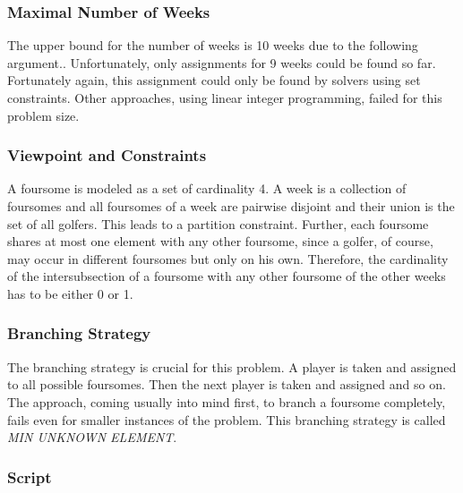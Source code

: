 \documentclass[a4paper,halfparskip]{scrartcl}
\begin{document}
\subsubsection{Maximal Number of Weeks}
The upper bound for the number of weeks is 10 weeks due to 
the following argument.. Unfortunately, only assignments 
for 9 weeks could be found so far. Fortunately again, 
this assignment could only be found by solvers using set 
constraints. Other approaches, using linear integer 
programming, failed for this problem size. 

\subsubsection{Viewpoint and Constraints}
A foursome is modeled as a set of cardinality 4. A week is 
a collection of foursomes and all foursomes of a week are 
pairwise disjoint and their union is the set of all golfers. 
This leads to a partition constraint. Further, each foursome 
shares at most one element with any other foursome, since 
a golfer, of course, may occur in different foursomes but 
only on his own. Therefore, the cardinality of the intersubsection 
of a foursome with any other foursome of the other weeks 
has to be either 0 or 1. 

\subsubsection{Branching Strategy}
The branching strategy is crucial for this problem.
A player is taken and assigned to all possible foursomes. 
Then the next player is taken and assigned and so on.
The approach, coming usually into mind first, to branch
a foursome completely, fails even for smaller instances of 
the problem. This branching strategy is called \emph{MIN UNKNOWN 
ELEMENT}.

\subsubsection{Script}
\end{document}
